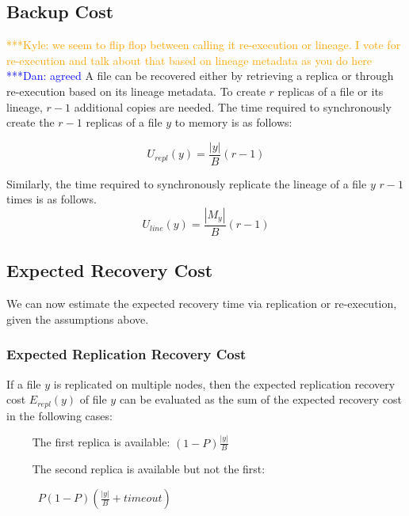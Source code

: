 \documentclass{sig-alternate}
\newcommand{\katznote}[1]{ {\textcolor{blue}    { ***Dan:      #1 }}}
\newcommand{\kylenote}[1]{{\textcolor{orange}    { ***Kyle:      #1 }}}
\newcommand{\katznote}[1]{}
\newcommand{\kylenote}[1]{}
\begin{document}
\subsection{Backup Cost}
\kylenote{we seem to flip flop between calling it re-execution or lineage. I vote for re-execution and talk about that based on lineage metadata as you do here} \katznote{agreed}
A file can be recovered either by retrieving a replica or through re-execution based on its lineage metadata.  To create $r$ replicas of a file or its lineage, $r-1$ additional copies are needed.  The time required to synchronously create the $r-1$ replicas of a file $y$ to memory is as follows:

\begin{equation}
U_{repl}(y) = \frac{|y|}{B} (r-1)
\end{equation}

Similarly, the time required to synchronously replicate the lineage of a file $y$ $r-1$ times is as follows.
\begin{equation}
U_{line}(y) = \frac{|M_{y}|}{B} (r-1)
\end{equation}

\subsection{Expected Recovery Cost}

We can now estimate the expected recovery time via replication or re-execution, given the assumptions above.

\subsubsection{Expected Replication Recovery Cost}
If a file $y$ is replicated on multiple nodes,
then the expected replication recovery cost $E_{repl}(y)$ of file $y$ can be evaluated as the sum
of the expected recovery cost in the following cases:

\noindent ~~~~ The first replica is available: $(1-P)\frac{|y|}{B}$

\noindent ~~~~ The second replica is available but not the first:\\

\vspace{-2ex}

~~~~~ $P(1-P)\left(\frac{|y|}{B}+timeout\right)$
\end{document}
